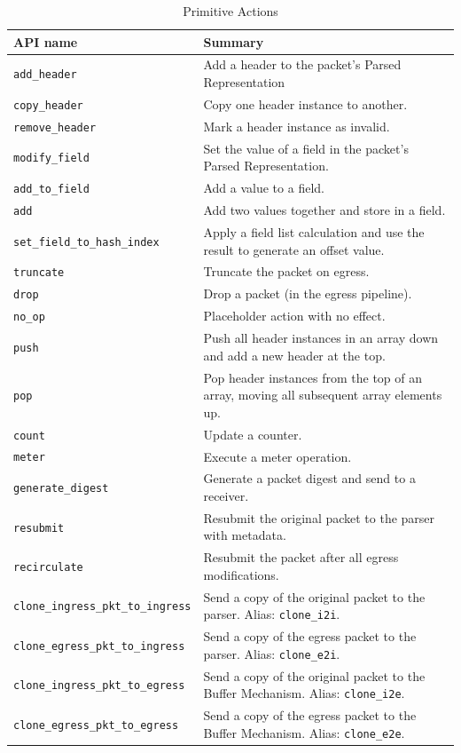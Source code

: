 \documentclass[12pt]{article}
\begin{document}
\begin{table}[H]
\begin{center}
\begin{tabular}{| l | p{} |} \hline
\textbf{API name} &
\textbf{Summary} \\ \hline
\texttt{add_header} &
Add a header to the packet's Parsed Representation \\ \hline
\texttt{copy_header} &
Copy one header instance to another. \\ \hline
\texttt{remove_header} &
Mark a header instance as invalid. \\ \hline
\texttt{modify_field} &
Set the value of a field in the packet's Parsed Representation. \\ \hline
\texttt{add_to_field} &
Add a value to a field. \\ \hline
\texttt{add} &
Add two values together and store in a field. \\ \hline
\texttt{set_field_to_hash_index} &
Apply a field list calculation and use the result to generate an offset value. \\ \hline
\texttt{truncate} &
Truncate the packet on egress. \\ \hline
\texttt{drop} &
Drop a packet (in the egress pipeline). \\ \hline
\texttt{no_op} &
Placeholder action with no effect. \\ \hline
\texttt{push} &
Push all header instances in an array down and add a new header at the top. \\ \hline
\texttt{pop} &
Pop header instances from the top of an array, moving all subsequent array elements up. \\ \hline
\texttt{count} &
Update a counter. \\ \hline
\texttt{meter} &
Execute a meter operation. \\ \hline
\texttt{generate_digest} &
Generate a packet digest and send to a receiver. \\ \hline
\texttt{resubmit} &
Resubmit the original packet to the parser with metadata. \\ \hline
\texttt{recirculate} &
Resubmit the packet after all egress modifications. \\ \hline
\texttt{clone_ingress_pkt_to_ingress} &
Send a copy of the original packet to the parser. Alias: \texttt{clone_i2i}. \\ \hline
\texttt{clone_egress_pkt_to_ingress} &
Send a copy of the egress packet to the parser. Alias: \texttt{clone_e2i}. \\ \hline
\texttt{clone_ingress_pkt_to_egress} &
Send a copy of the original packet to the Buffer Mechanism. Alias: \texttt{clone_i2e}. \\ \hline
\texttt{clone_egress_pkt_to_egress} &
Send a copy of the egress packet to the Buffer Mechanism. Alias: \texttt{clone_e2e}. \\ \hline
\end{tabular}
\end{center}
\caption{Primitive Actions}
\label{tab:primitiveactions}
\end{table}
\end{document}
